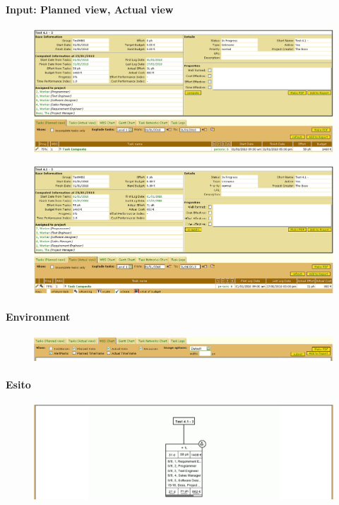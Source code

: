 \paragraph{Input: Planned view, Actual view}
\begin{figure}[h!]
\centering
\includegraphics[width=\textwidth]{tests/TEST_WBS/4.1/4.1_3/Esempio_1/input.png}
\end{figure}
\begin{figure}[h!]
\centering
\includegraphics[width=\textwidth]{tests/TEST_WBS/4.1/4.1_3/Esempio_1/input_actual.png}
\end{figure}
\newpage

\paragraph{Environment}
\begin{figure}[h!]
\centering
\includegraphics[width=\textwidth]{tests/TEST_WBS/4.1/4.1_3/Esempio_1/environment.png}
\end{figure}

\paragraph{Esito}
\begin{figure}[h!]
\centering
\includegraphics[width=\textwidth]{tests/TEST_WBS/4.1/4.1_3/Esempio_1/output.png}
\end{figure}
\newpage

